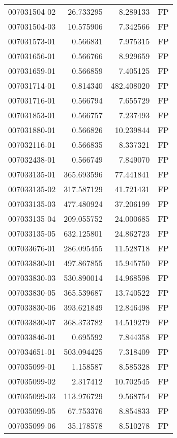 \begin{tabular}{lrrl}
007031504-02 &   26.733295 &     8.289133 &   FP \\
007031504-03 &   10.575906 &     7.342566 &   FP \\
007031573-01 &    0.566831 &     7.975315 &   FP \\
007031656-01 &    0.566766 &     8.929659 &   FP \\
007031659-01 &    0.566859 &     7.405125 &   FP \\
007031714-01 &    0.814340 &   482.408020 &   FP \\
007031716-01 &    0.566794 &     7.655729 &   FP \\
007031853-01 &    0.566757 &     7.237493 &   FP \\
007031880-01 &    0.566826 &    10.239844 &   FP \\
007032116-01 &    0.566835 &     8.337321 &   FP \\
007032438-01 &    0.566749 &     7.849070 &   FP \\
007033135-01 &  365.693596 &    77.441841 &   FP \\
007033135-02 &  317.587129 &    41.721431 &   FP \\
007033135-03 &  477.480924 &    37.206199 &   FP \\
007033135-04 &  209.055752 &    24.000685 &   FP \\
007033135-05 &  632.125801 &    24.862723 &   FP \\
007033676-01 &  286.095455 &    11.528718 &   FP \\
007033830-01 &  497.867855 &    15.945750 &   FP \\
007033830-03 &  530.890014 &    14.968598 &   FP \\
007033830-05 &  365.539687 &    13.740522 &   FP \\
007033830-06 &  393.621849 &    12.846498 &   FP \\
007033830-07 &  368.373782 &    14.519279 &   FP \\
007033846-01 &    0.695592 &     7.844358 &   FP \\
007034651-01 &  503.094425 &     7.318409 &   FP \\
007035099-01 &    1.158587 &     8.585328 &   FP \\
007035099-02 &    2.317412 &    10.702545 &   FP \\
007035099-03 &  113.976729 &     9.568754 &   FP \\
007035099-05 &   67.753376 &     8.854833 &   FP \\
007035099-06 &   35.178578 &     8.510278 &   FP \\

\end{tabular}
